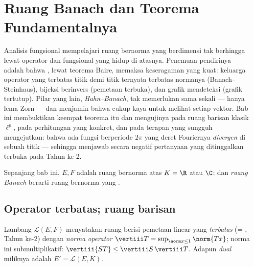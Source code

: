 \chapter{Ruang Banach dan Teorema Fundamentalnya}
\label{ch:b3:banach}

Analisis fungsional mempelajari ruang bernorma yang berdimensi tak berhingga
lewat operator dan fungsional yang hidup di atasnya. Penemuan
pendirinya adalah bahwa \emph{}, lewat teorema
Baire, memaksa keseragaman yang kuat: keluarga operator yang terbatas titik demi
titik ternyata terbatas normanya (Banach--Steinhaus),
bijeksi  berinvers  (pemetaan terbuka), dan grafik
mendeteksi  (grafik tertutup). Pilar yang lain,
\emph{Hahn--Banach}, tak memerlukan  sama sekali --- hanya
lema Zorn --- dan menjamin bahwa  cukup kaya
untuk melihat setiap vektor. Bab ini membuktikan keempat teorema itu dan
mengujinya pada ruang barisan klasik $\ell^p$, pada
perhitungan  yang konkret, dan pada terapan yang sungguh
mengejutkan: bahwa ada fungsi  berperiode $2\pi$
yang deret Fouriernya \emph{divergen} di sebuah titik --- sehingga menjawab
secara negatif pertanyaan yang ditinggalkan terbuka pada Tahun ke-2.

Sepanjang bab ini, $E, F$ adalah ruang bernorma atas $K = \R$ atau $\C$; dan
\emph{ruang Banach} berarti ruang bernorma
yang .

\section{Operator terbatas; ruang barisan}

\begin{definition}\label{def:b3:banach:operator}
Lambang $\mathcal L(E, F)$ menyatakan ruang berisi pemetaan linear yang
\emph{terbatas} (= , Tahun ke-2) dengan \emph{norma
operator} $\vertiii T = \sup_{\norm x \leq
1}\norm{Tx}$; norma ini submultiplikatif: $\vertiii{ST} \leq
\vertiii S\,\vertiii T$. Adapun \emph{dual} miliknya adalah
$E' = \mathcal L(E, K)$.
\end{definition}

